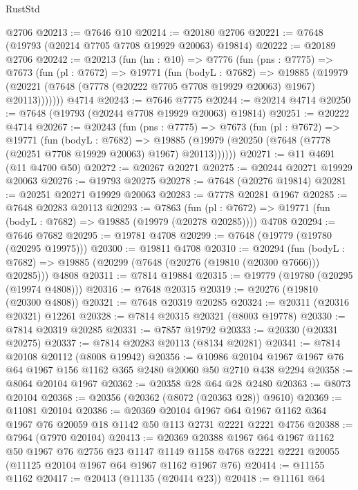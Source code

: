 \begin{lexlean}{RustStd}
\begin{coremodule}
    @2706
@20213 := @7646 @10
@20214 := @20180 @2706
@20221 := @7648 (@19793 (@20214 @7705 @7708 @19929 @20063) @19814)
@20222 := @20189 @2706
@20242 := @20213
    (fun (hn : @10) =>
    @7776
      (fun (pns : @7775) =>
      @7673
        (fun (pl : @7672) =>
        @19771
          (fun (bodyL : @7682) =>
          @19885
            (@19979 (@20221 (@7648 (@7778 (@20222 @7705 @7708 @19929 @20063) @1967) @20113)))))))
    @4714
@20243 := @7646 @7775
@20244 := @20214 @4714
@20250 := @7648 (@19793 (@20244 @7708 @19929 @20063) @19814)
@20251 := @20222 @4714
@20267 := @20243
    (fun (pns : @7775) =>
    @7673
      (fun (pl : @7672) =>
      @19771
        (fun (bodyL : @7682) =>
        @19885 (@19979 (@20250 (@7648 (@7778 (@20251 @7708 @19929 @20063) @1967) @20113))))))
@20271 := @11 @4691 (@11 @4700 @50)
@20272 := @20267 @20271
@20275 := @20244 @20271 @19929 @20063
@20276 := @19793 @20275
@20278 := @7648 (@20276 @19814)
@20281 := @20251 @20271 @19929 @20063
@20283 := @7778 @20281 @1967
@20285 := @7648 @20283 @20113
@20293 := @7863
    (fun (pl : @7672) => @19771 (fun (bodyL : @7682) => @19885 (@19979 (@20278 @20285))))
    @4708
@20294 := @7646 @7682
@20295 := @19781 @4708
@20299 := @7648 (@19779 (@19780 (@20295 @19975)))
@20300 := @19811 @4708
@20310 := @20294
    (fun (bodyL : @7682) => @19885 (@20299 (@7648 (@20276 (@19810 (@20300 @7666))) @20285)))
    @4808
@20311 := @7814 @19884
@20315 := @19779 (@19780 (@20295 (@19974 @4808)))
@20316 := @7648 @20315
@20319 := @20276 (@19810 (@20300 @4808))
@20321 := @7648 @20319 @20285
@20324 := @20311 (@20316 @20321) @12261
@20328 := @7814 @20315 @20321 (@8003 @19778)
@20330 := @7814 @20319 @20285
@20331 := @7857 @19792
@20333 := @20330 (@20331 @20275)
@20337 := @7814 @20283 @20113 (@8134 @20281)
@20341 := @7814 @20108 @20112 (@8008 @19942)
@20356 := @10986 @20104 @1967 @1967 @76 @64 @1967 @156 @1162 @365 @2480 @20060 @50 @2710 @438 @2294
@20358 := @8064 @20104 @1967
@20362 := @20358 @28 @64 @28 @2480
@20363 := @8073 @20104
@20368 := @20356 (@20362 (@8072 (@20363 @28)) @9610)
@20369 := @11081 @20104
@20386 := @20369
    @20104
    @1967
    @64
    @1967
    @1162
    @364
    @1967
    @76
    @20059
    @18
    @1142
    @50
    @113
    @2731
    @2221
    @2221
    @4756
@20388 := @7964 (@7970 @20104)
@20413 := @20369
    @20388
    @1967
    @64
    @1967
    @1162
    @50
    @1967
    @76
    @2756
    @23
    @1147
    @1149
    @1158
    @4768
    @2221
    @2221
    @20055
    (@11125 @20104 @1967 @64 @1967 @1162 @1967 @76)
@20414 := @11155 @1162
@20417 := @20413 (@11135 (@20414 @23))
@20418 := @11161 @64

\end{coremodule}
\end{lexlean}

